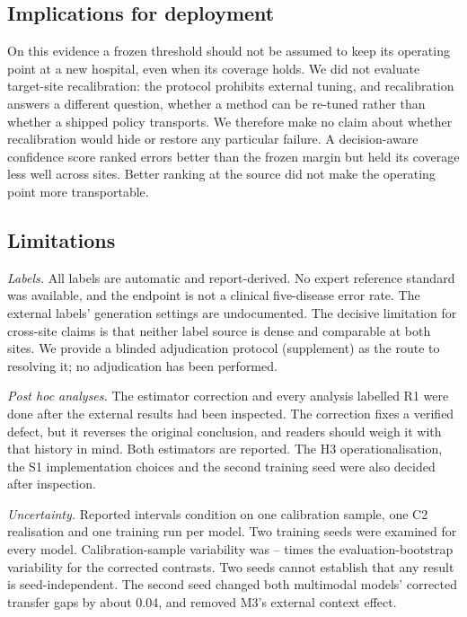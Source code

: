 \subsection{Implications for deployment}
On this evidence a frozen threshold should not be assumed to keep its
operating point at a new hospital, even when its coverage holds. We did not
evaluate target-site recalibration: the protocol prohibits external tuning,
and recalibration answers a different question, whether a method can be
re-tuned rather than whether a shipped policy transports. We therefore make
no claim about whether recalibration would hide or restore any particular
failure. A decision-aware confidence score ranked errors better than the frozen
margin but held its coverage less well across sites. Better ranking at the
source did not make the operating point more transportable.

\subsection{Limitations}
\label{sec:limitations}
\emph{Labels.} All labels are automatic and report-derived. No expert
reference standard was available, and the endpoint is not a clinical
five-disease error rate. The external labels' generation settings are
undocumented. The decisive limitation for cross-site claims is that neither
label source is dense and comparable at both sites. We provide a blinded
adjudication protocol (supplement) as the route to resolving it; no
adjudication has been performed.

\emph{Post hoc analyses.} The estimator correction and every analysis labelled
R1 were done after the external results had been inspected. The correction
fixes a verified defect, but it reverses the original conclusion, and readers
should weigh it with that history in mind. Both estimators are reported. The
H3 operationalisation, the S1 implementation choices and the second training
seed were also decided after inspection.

\emph{Uncertainty.} Reported intervals condition on one calibration sample,
one C2 realisation and one training run per model. Two training seeds were
examined for every model. Calibration-sample
variability was \CalRatioMin{}--\CalRatioMax{} times the evaluation-bootstrap variability for the
corrected contrasts. Two seeds cannot establish that any result is
seed-independent. The second seed changed both multimodal models' corrected
transfer gaps by about 0.04, and removed M3's external context effect.

